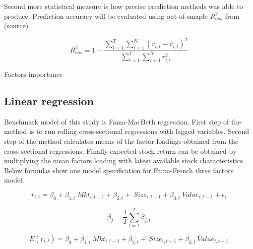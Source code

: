 \documentclass{article}
\begin{document}
Second more statistical measure is how precise prediction methods was able to produce. Prediction accuracy will be evaluated using out-of-smaple $R^{2}_{oos} $ from (source). 

\begin{equation}
\label{eq:r2}
R^{2}_{oos} = 1 - \frac{\sum^T_{t=1} \sum^N_{i=1} (r_{i, t} - \hat r_{i, t})^2}{ \sum^T_{t=1} \sum^N_{i=1} r^2_{i, t}}
\end{equation}

Factors importance

\subsection{Linear regression}
Benchmark model of this study is Fama-MacBeth \citeyear{FamaMacBeth1973} regression. First step of the method is to run rolling cross-sectional regressions with lagged variables. Second step of the method calculates means of the factor loadings obtained from the cross-sectional regressions. Finally expected stock return can be obtained by multiplying the mean factors loading with latest available stock characteristics. Below formulas show one model specification for Fama-French \citeyear{FAMA19933} three factors model.

\begin{equation}
r_{i, t} = \beta_0 + \beta_{1,t} \ Mkt_{i, t-1} + \beta_{2, t} + \ Size_{i, t-1} + \beta_{3, t} \ Value_{i, t-1} + \epsilon_{i}
\end{equation}

\begin{equation}
\overline \beta_j = \frac{1}{T} \sum^{T}_{t=1}\beta_{j, t}
\end{equation}

\begin{equation}
E(r_{i, t}) = \overline \beta_0 + \overline \beta_{1, t} \ Mkt_{i, t-1} + \overline \beta_{2, t} + \ Size_{i, t-1} + \overline \beta_{3, t} \ Value_{i, t-1}
\end{equation}
\end{document}
